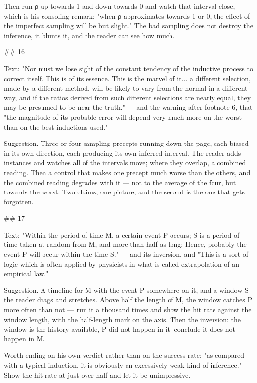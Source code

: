 Then run ρ up towards 1 and down towards 0 and watch that interval close, which
is his consoling remark: "when ρ approximates towards 1 or 0, the effect of the
imperfect sampling will be but slight." The bad sampling does not destroy the
inference, it blunts it, and the reader can see how much.


## 16

Text: "Nor must we lose sight of the constant tendency of the inductive process
to correct itself. This is of its essence. This is the marvel of it... a
different selection, made by a different method, will be likely to vary from the
normal in a different way, and if the ratios derived from such different
selections are nearly equal, they may be presumed to be near the truth." — and
the warning after footnote 6, that "the magnitude of its probable error will
depend very much more on the worst than on the best inductions used."

Suggestion. Three or four sampling precepts running down the page, each biased
in its own direction, each producing its own inferred interval. The reader adds
instances and watches all of the intervals move; where they overlap, a combined
reading. Then a control that makes one precept much worse than the others, and
the combined reading degrades with it — not to the average of the four, but
towards the worst. Two claims, one picture, and the second is the one that gets
forgotten.


## 17

Text: "Within the period of time M, a certain event P occurs; S is a period of
time taken at random from M, and more than half as long: Hence, probably the
event P will occur within the time S." — and its inversion, and "This is a sort
of logic which is often applied by physicists in what is called extrapolation of
an empirical law."

Suggestion. A timeline for M with the event P somewhere on it, and a window S
the reader drags and stretches. Above half the length of M, the window catches P
more often than not — run it a thousand times and show the hit rate against the
window length, with the half-length mark on the axis. Then the inversion: the
window is the history available, P did not happen in it, conclude it does not
happen in M.

Worth ending on his own verdict rather than on the success rate: "as compared
with a typical induction, it is obviously an excessively weak kind of
inference." Show the hit rate at just over half and let it be unimpressive.


